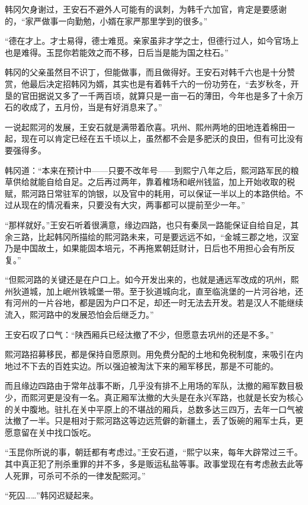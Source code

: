韩冈欠身谢过，王安石不避外人可能有的讽刺，为韩千六加官，肯定是要感谢的，“家严做事一向勤勉，小婿在家严那里学到的很多。”

“德在才上。才士易得，德士难觅。亲家虽非才学之士，但德行过人，如今官场上也是难得。玉昆你若能效之而不移，日后当是能为国之柱石。”

韩冈的父亲虽然目不识丁，但能做事，而且做得好。王安石对韩千六也是十分赞赏，他最后决定招韩冈为婿，其实也是有着韩千六的一份功劳在，“去岁秋冬，开垦的官田据说又多了一千两百顷，就算只是一亩一石的薄田，今年也是多了十余万石的收成了，五月份，当是有好消息来了。”

一说起熙河的发展，王安石就是满带着欣喜。巩州、熙州两地的田地连着棉田一起，现在可以肯定已经在五千顷以上，虽然都不会是多肥沃的良田，但有可比没有要强得多。

韩冈道：“本来在预计中——只要不改年号——到熙宁八年之后，熙河路军民的粮草供给就能自给自足。之后再过两年，靠着榷场和岷州钱监，加上开始收取的税赋，熙河路日常驻军的饷银，以及官中的耗用，可以保证一半以上的本路供给。不过从现在的情况看来，只要没有大灾，两事都可以提前至少一年。”

“那样就好。”王安石听着很满意，缘边四路，也只有秦凤一路能保证自给自足，其余三路，比起韩冈所描绘的熙河路未来，可是要远远不如，“金城三郡之地，汉室乃是中国故土，如果能固本培元，不再拖累朝廷财计，日后也不用担心会有所反复。”

“但熙河路的关键还是在户口上。如今开发出来的，也就是通远军改成的巩州，熙州狄道城，加上岷州铁城堡一带。至于狄道城向北，直至临洮堡的一片河谷地，还有河州的一片谷地，都是因为户口不足，却还一时无法去开发。若是汉人不能继续流入，熙河路中的发展恐怕会后继乏力。”

王安石叹了口气：“陕西厢兵已经汰撤了不少，但愿意去巩州的还是不多。”

熙河路招募移民，都是保持自愿原则。用免费分配的土地和免税制度，来吸引在内地过不下去的百姓实边。所以强迫被淘汰下来的厢军移民，那是不可能的。

而且缘边四路由于常年战事不断，几乎没有排不上用场的军队，汰撤的厢军数目极少，而熙河更是没有一名。真正厢军汰撤的大头是在永兴军路，也就是长安为核心的关中腹地。驻扎在关中平原上的不堪战的厢兵，总数多达三四万，去年一口气被汰撤了一半。只是相对于熙河路这等边远荒僻的新疆土，丢了饭碗的厢军士兵，更愿意留在关中找口饭吃。

“玉昆你所说的事，朝廷都有考虑过。”王安石道，“熙宁以来，每年大辟常过三千。其中真正犯了刑杀重罪的并不多，多是贩运私盐等事。政事堂现在有考虑赦去此等人死罪，可杀可不杀的一律发配熙河。”

“死囚……”韩冈迟疑起来。

